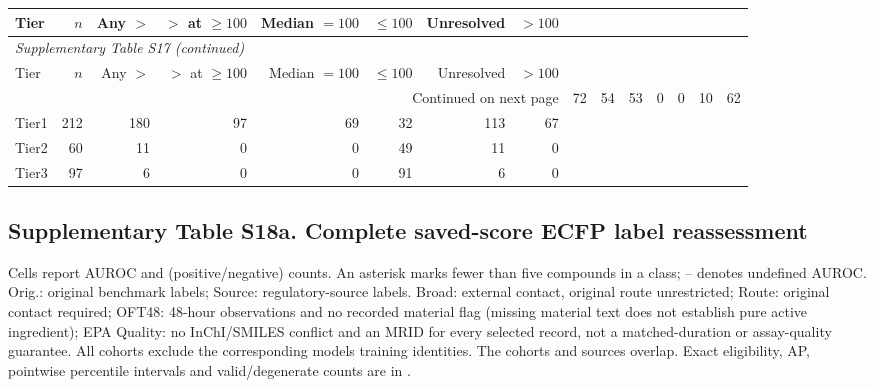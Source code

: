\begingroup\footnotesize\setlength{\tabcolsep}{4pt}

\begin{longtable}{lrrrrrrr}

\toprule Tier & $n$ & Any $>$ & $>$ at $\geq100$ & Median $=100$ & $\leq100$ & Unresolved & $>100$ \\ \midrule\endfirsthead

\multicolumn{8}{l}{\textit{Supplementary Table S17 (continued)}} \\

\toprule Tier & $n$ & Any $>$ & $>$ at $\geq100$ & Median $=100$ & $\leq100$ & Unresolved & $>100$ \\ \midrule\endhead

\midrule\multicolumn{8}{r}{Continued on next page}\endfoot\bottomrule\endlastfoot

Tier0 & 72 & 54 & 53 & 0 & 0 & 10 & 62 \\
Tier1 & 212 & 180 & 97 & 69 & 32 & 113 & 67 \\
Tier2 & 60 & 11 & 0 & 0 & 49 & 11 & 0 \\
Tier3 & 97 & 6 & 0 & 0 & 91 & 6 & 0 \\

\end{longtable}\endgroup

\subsection*{Supplementary Table S18a. Complete saved-score ECFP label reassessment}

Cells report AUROC and (positive/negative) counts. An asterisk marks fewer than five compounds in a class; -- denotes undefined AUROC. Orig.: original benchmark labels; Source: regulatory-source labels. Broad: external contact, original route unrestricted; Route: original contact required; OFT48: 48-hour observations and no recorded material flag (missing material text does not establish pure active ingredient); EPA Quality: no InChI/SMILES conflict and an MRID for every selected record, not a matched-duration or assay-quality guarantee. All cohorts exclude the corresponding model\textquotesingle s training identities. The cohorts and sources overlap. Exact eligibility, AP, pointwise percentile intervals and valid/degenerate counts are in .

\begingroup\small\setlength{\tabcolsep}{4pt}\renewcommand{\arraystretch}{0.97}

